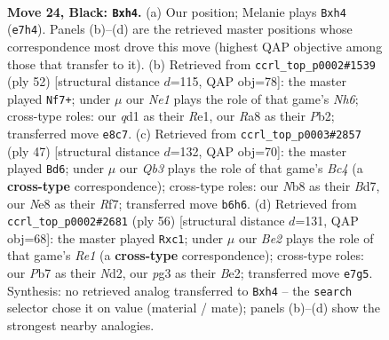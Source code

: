 \documentclass[11pt]{article}
\begin{document}
\clearpage

\begin{figure}[p]\centering
\begin{subfigure}{0.46\textwidth}\centering
\resizebox{\linewidth}{!}{%
\newchessgame
\chessboard[
  setfen={rnb1n1k1/1p2b1pp/1q5B/p4p1P/P1PN3R/6P1/6B1/RN1Q2K1 b - - 0 24},
  showmover=false,
  pgfstyle=straightmove, color=movearrow, markmove={e7-h4}
]}
\caption{}
\end{subfigure}\hfill
\begin{subfigure}{0.46\textwidth}\centering
\resizebox{\linewidth}{!}{%
\newchessgame
\chessboard[
  setfen={4rb1k/3n2n1/r1q3QN/3p4/pp1PP2B/3b3P/PP1N1PP1/4R1K1 w - - 1 27},
  showmover=false,
  pgfstyle=straightmove, color=movearrow, markmove={h6-f7}
]}
\caption{}
\end{subfigure}
\\[4pt]
\begin{subfigure}{0.46\textwidth}\centering
\resizebox{\linewidth}{!}{%
\newchessgame
\chessboard[
  setfen={r5k1/p2b1r2/2p1p3/2b1qpp1/2R5/2N1B2P/PPP1Q1P1/4R1K1 b - - 0 24},
  showmover=false,
  pgfstyle=straightmove, color=movearrow, markmove={c5-d6}
]}
\caption{}
\end{subfigure}\hfill
\begin{subfigure}{0.46\textwidth}\centering
\resizebox{\linewidth}{!}{%
\newchessgame
\chessboard[
  setfen={q3r1k1/3b1pp1/4p1np/bN1n4/1P2Q3/P3B2P/3NBPP1/2r1R1K1 w - - 0 29},
  showmover=false,
  pgfstyle=straightmove, color=movearrow, markmove={e1-c1}
]}
\caption{}
\end{subfigure}
\caption{\textbf{Move 24, Black: \texttt{Bxh4}.} (a) Our position; Melanie plays \texttt{Bxh4} (\texttt{e7h4}). Panels (b)--(d) are the retrieved master positions whose correspondence most drove this move (highest QAP objective among those that transfer to it). (b) Retrieved from \texttt{ccrl\_top\_p0002\#1539} (ply 52) [structural distance $d$=115, QAP obj=78]: the master played \texttt{Nf7+}; under $\mu$ our \emph{Ne1} plays the role of that game's \emph{Nh6}; cross-type roles: our \emph{q}d1 as their \emph{R}e1, our \emph{R}a8 as their \emph{P}b2; transferred move \texttt{e8c7}. (c) Retrieved from \texttt{ccrl\_top\_p0003\#2857} (ply 47) [structural distance $d$=132, QAP obj=70]: the master played \texttt{Bd6}; under $\mu$ our \emph{Qb3} plays the role of that game's \emph{Bc4} (a \textbf{cross-type} correspondence); cross-type roles: our \emph{N}b8 as their \emph{B}d7, our \emph{N}e8 as their \emph{R}f7; transferred move \texttt{b6h6}. (d) Retrieved from \texttt{ccrl\_top\_p0002\#2681} (ply 56) [structural distance $d$=131, QAP obj=68]: the master played \texttt{Rxc1}; under $\mu$ our \emph{Be2} plays the role of that game's \emph{Re1} (a \textbf{cross-type} correspondence); cross-type roles: our \emph{P}b7 as their \emph{N}d2, our \emph{p}g3 as their \emph{B}e2; transferred move \texttt{e7g5}. Synthesis: no retrieved analog transferred to \texttt{Bxh4} -- the \texttt{search} selector chose it on value (material / mate); panels (b)--(d) show the strongest nearby analogies.}
\label{fig:thought-m47}
\end{figure}
\end{document}
